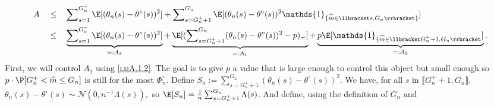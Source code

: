 \begin{alignat*}{3}
& A && \leq && \sum\nolimits_{s = 1}^{G_{n}^{+}} \E[(\theta_{n}(s) - \theta^{\circ}(s))^{2}] + \sum\nolimits_{s = G_{n}^{+} + 1}^{G_{n}} \E [ (\theta_{n}(s) - \theta^{\circ}(s) )^{2} \mathds{1}_{\{\widehat{m} \in \llbracket s, G_{n} \rrbracket\}}]\\
& &&\leq&& \underbrace{\sum\nolimits_{s = 1}^{G_{n}^{+}} \E[(\theta_{n}(s) - \theta^{\circ}(s))^{2}]}_{=: A_{3}} + \underbrace{\E[ (\sum\nolimits_{s = G_{n}^{+} + 1}^{G_{n}}(\theta_{n}(s) - \theta^{\circ}(s) )^{2} - p)_{+}]}_{=: A_{1}} + \underbrace{p \E[\mathds{1}_{\{\widehat{m} \in \llbracket G_{n}^{+}+1, G_{n} \rrbracket}]}_{=: A_{2}} .
\end{alignat*}
First, we will control $A_{1}$ using \textsc{\cref{lmA.1.2}}.
The goal is to give $p$ a value that is large enough to control this object but small enough so $p \cdot \P [G_{n}^{+} < \widehat{m} \leq G_{n}]$ is still for the most $\Phi_{n}^{\circ}$.
Define $S_{n} := \sum\nolimits_{s = G_{n}^{+} + 1}^{G_{n}}(\theta_{n}(s) - \theta^{\circ}(s))^{2}.$
We have, for all $s$ in $\llbracket G_{n}^{+} + 1, G_{n} \rrbracket$, $\theta_{n}(s) - \theta^{\circ}(s) \sim \mathcal{N}(0, n^{-1}\Lambda(s) ),$
so $\E[S_{n}] = \frac{1}{n} \sum\nolimits_{s = G_{n}^{+} + 1}^{G_{n}} \Lambda(s)$.
And define, using the definition of $G_{n}$ and 
